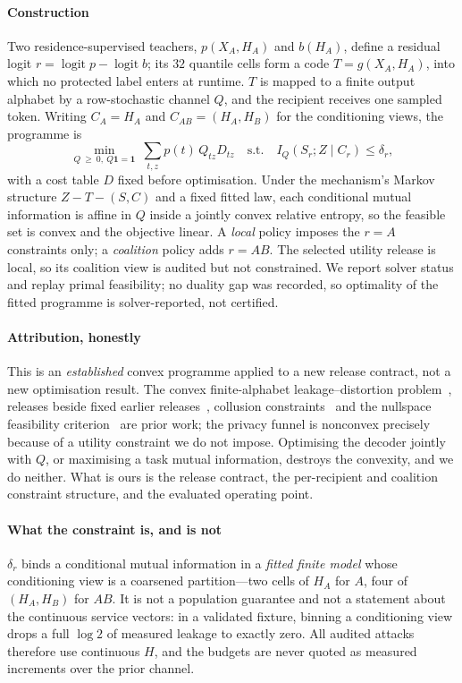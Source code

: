 \documentclass[conference]{IEEEtran}
\begin{document}
\paragraph{Construction} Two residence-supervised teachers, $p(X_A,H_A)$ and $b(H_A)$, define a residual
logit $r=\operatorname{logit}p-\operatorname{logit}b$; its $32$ quantile cells form a code $T=g(X_A,H_A)$,
into which no protected label enters at runtime. $T$ is mapped to a finite output alphabet by a
row-stochastic channel $Q$, and the recipient receives one sampled token. Writing
$C_A=H_A$ and $C_{AB}=(H_A,H_B)$ for the conditioning views, the programme is
\[
\min_{Q\ \ge\ 0,\ Q\mathbf{1}=\mathbf{1}}\ \sum_{t,z}p(t)\,Q_{tz}D_{tz}
\quad\text{s.t.}\quad I_Q(S_r;Z\mid C_r)\le\delta_r ,
\]
with a cost table $D$ fixed before optimisation. Under the mechanism's Markov structure $Z-T-(S,C)$ and a
fixed fitted law, each conditional mutual information is affine in $Q$ inside a jointly convex relative
entropy, so the feasible set is convex and the objective linear. A \emph{local} policy imposes the $r=A$
constraints only; a \emph{coalition} policy adds $r=AB$. The selected utility release is local, so its
coalition view is audited but not constrained. We report solver status and replay primal feasibility;
no duality gap was recorded, so optimality of the fitted programme is solver-reported, not certified.

\paragraph{Attribution, honestly} This is an \emph{established} convex programme applied to a new release
contract, not a new optimisation result. The convex finite-alphabet leakage--distortion
problem~\cite{calmon2012privacy}, releases beside fixed earlier releases~\cite{erdogdu2015continual},
collusion constraints~\cite{taylor2026collusion} and the nullspace feasibility
criterion~\cite{rassouli2021perfect} are prior work; the privacy funnel is nonconvex precisely because of
a utility constraint we do not impose. Optimising the decoder jointly with
$Q$, or maximising a task mutual information, destroys the convexity, and we do neither. What is ours is
the release contract, the per-recipient and coalition constraint structure, and the evaluated operating
point.

\paragraph{What the constraint is, and is not} $\delta_r$ binds a conditional mutual information in a
\emph{fitted finite model} whose conditioning view is a coarsened partition---two cells of $H_A$ for
$A$, four of $(H_A,H_B)$ for $AB$. It is not a population
guarantee and not a statement about the continuous service vectors: in a validated fixture, binning a
conditioning view drops a full $\log 2$ of measured leakage to exactly zero. All audited attacks therefore
use continuous $H$, and the budgets are never quoted as measured increments over the prior channel.
\end{document}
